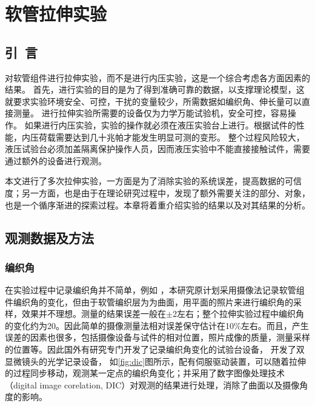 
\chapter{软管拉伸实验}
\section{引~言}
对软管组件进行拉伸实验，而不是进行内压实验，这是一个综合考虑各方面因素的结果。
首先，进行实验的目的是为了得到准确可靠的数据，以支撑理论模型，这就要求实验环境安全、可控，干扰的变量较少，所需数据如编织角、伸长量可以直接测量。
进行拉伸实验所需要的设备仅为力学万能试验机，安全可控，容易操作。
如果进行内压实验，实验的操作就必须在液压实验台上进行。根据试件的性能，内压荷载需要达到几十兆帕才能发生明显可测的变形。
整个过程风险较大，液压试验台必须加盖隔离保护操作人员，因而液压实验中不能直接接触试件，需要通过额外的设备进行观测。

本文进行了多次拉伸实验，一方面是为了消除实验的系统误差，提高数据的可信度；另一方面，也是由于在理论研究过程中，发现了额外需要关注的部分、对象，也是一个循序渐进的探索过程。本章将着重介绍实验的结果以及对其结果的分析。
\section{观测数据及方法}


\subsection{编织角}
在实验过程中记录编织角并不简单，例如 ，本研究原计划采用摄像法记录软管组件编织角的变化，但由于软管编织层为为曲面，用平面的照片来进行编织角的采样，效果并不理想。测量的结果误差一般在$ \pm $2\textdegree 左右；整个拉伸实验过程中编织角的变化约为20\textdegree 。因此简单的摄像测量法相对误差保守估计在10\%左右。而且，产生误差的因素也很多，包括摄像设备与试件的相对位置，照片成像的质量，测量采样的位置等。因此国外有研究专门开发了记录编织角变化的试验台设备， \citeauthor{Leung2013}\cite{Leung2013}开发了双显微镜头的光学记录设备，
如\ref{fig:dic}图所示，配有伺服驱动装置，可以随着拉伸的过程同步移动，观测某一定点的编织角变化；并采用了数字图像处理技术（digital image corelation, DIC）对观测的结果进行处理，消除了曲面以及摄像角度的影响。

